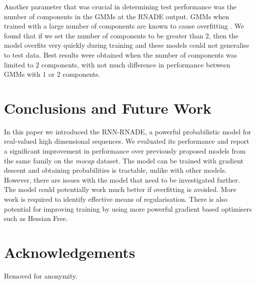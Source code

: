 \documentclass{article} %
\begin{document}
Another parameter that was crucial in determining test performance was the number of components in the GMMs at the RNADE output. GMMs when trained with a large number of components are known to cause overfitting \cite{bishop2006pattern}. We found that if we set the number of components to be greater than 2, then the model overfits very quickly during training and these models could not generalise to test data. Best results were obtained when the number of components was limited to $2$ components, with not much difference in performance between GMMs with $1$ or $2$ components.  

\section{Conclusions and Future Work}

In this paper we introduced the RNN-RNADE, a powerful probabilistic model for real-valued high dimensional sequences. We evaluated its performance and report a significant improvement in performance over previously proposed models from the same family on the \textit{mocap} dataset. The model can be trained with gradient descent and obtaining probabilities is tractable, unlike with other models. However, there are issues with the model that need to be investigated further. The model could potentially work much better if overfitting is avoided. More work is required to identify effective means of regularisation. There is also potential for improving training by using more powerful gradient based optimisers such as Hessian Free. 
\label{conclusion}

\section{Acknowledgements}

Removed for anonymity. 



\end{document}
